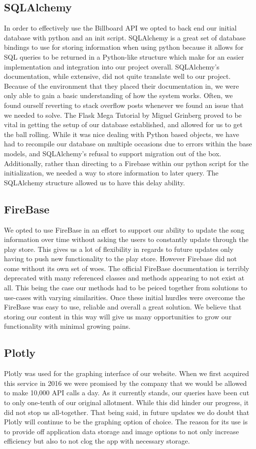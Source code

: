\documentclass{article}
\begin{document}
\subsection*{SQLAlchemy}
In order to effectively use the Billboard API we opted to back end our initial database with python and an init script. SQLAlchemy is a great set of database bindings to use for storing information when using python because it allows for SQL queries to be returned in a Python-like structure which make for an easier implementation and integration into our project overall.
SQLAlchemy's documentation, while extensive, did not quite translate well to our project.
Because of the environment that they placed their documentation in, we were only able to gain a basic understanding of how the system works.
Often, we found ourself reverting to stack overflow posts whenever we found an issue that we needed to solve.
The Flask Mega Tutorial by Miguel Grinberg proved to be vital in getting the setup of our database established, and allowed for us to get the ball rolling.
While it was nice dealing with Python based objects, we have had to recompile our database on multiple occasions due to errors within the base models, and SQLAlchemy's refusal to support migration out of the box.
Additionally, rather than directing to a Firebase within our python script for the initialization, we needed a way to store information to later query. 
The SQLAlchemy structure allowed us to have this delay ability. 
\subsection*{FireBase}
We opted to use FireBase in an effort to support our ability to update the song information over time without asking the users to constantly update through the play store. This gives us a lot of flexibility in regards to future updates only having to push new functionality to the play store. However Firebase did not come without its own set of woes. The official FireBase documentation is terribly deprecated with many referenced classes and methods appearing to not exist at all. This being the case our methods had to be peiced together from solutions to use-cases with varying similarities. Once these initial hurdles were overcome the FireBase was easy to use, reliable and overall a great solution. We believe that storing our content in this way will give us many opportunities to grow our functionality with minimal growing pains.  
\subsection*{Plotly}
Plotly was used for the graphing interface of our website.
When we first acquired this service in 2016 we were promised by the company that we would be allowed to make 10,000 API calls a day.
As it currently stands, our queries have been cut to only one-tenth of our original allotment. While this did hinder our progress, it did not stop us all-together. That being said, in future updates we do doubt that Plotly will continue to be the graphing option of choice.
The reason for its use is to provide off application data storage and image options to not only increase efficiency but also to not clog the app with necessary storage.
\end{document}
